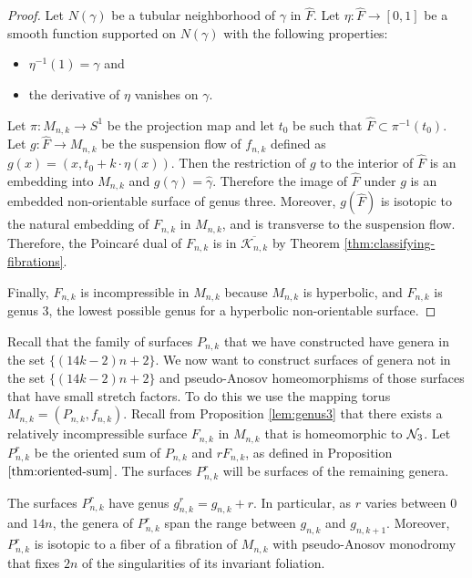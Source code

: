 \begin{proof}
  Let $N(\gamma)$ be a tubular neighborhood of $\gamma$ in $\hat{F}$.  Let $\eta: \hat{F} \xrightarrow{} [0,1]$ be a smooth function supported on $N(\gamma)$ with the following properties:
  \begin{itemize}
      \item $\eta^{-1}(1) = \gamma$ and
      \item the derivative of $\eta$ vanishes on $\gamma$. 
    \end{itemize}
Let $\pi:M_{n,k}\rightarrow S^1$ be the projection map and let $t_0$ be such that $\hat{F}\subset\pi^{-1}(t_0)$.  Let $g: \hat{F} \xrightarrow{} M_{n,k}$ be the suspension flow of $f_{n,k}$ defined as $g(x) =(x,t_0+k\cdot\eta(x))$. Then the restriction of $g$ to the interior of $\hat{F}$ is an embedding into $M_{n,k}$ and $g(\gamma) = \hat{\gamma}$. Therefore the image of $\hat{F}$ under $g$ is an embedded non-orientable surface of genus three. Moreover, $g(\hat{F})$ is isotopic to the natural embedding of $F_{n,k}$ in $M_{n,k}$, and is transverse to the suspension flow.  
  Therefore, the Poincar\'e dual of $F_{n,k}$ is in $\overline{\mathcal{K}_{n,k}}$ by Theorem \ref{thm:classifying-fibrations}.
   
  Finally, $F_{n,k}$ is incompressible in $M_{n,k}$ because $M_{n,k}$ is hyperbolic, and $F_{n,k}$ is genus $3$, the
  lowest possible genus for a hyperbolic non-orientable surface.
\end{proof}



Recall that the family of surfaces $P_{n,k}$ that we have constructed have genera in the set $\{(14k-2)n+2\}$.
We now want to construct surfaces of genera not in the set $\{(14k-2)n+2\}$ and pseudo-Anosov homeomorphisms of those surfaces that have small stretch factors.  To do this we use the mapping torus $M_{n,k}= (P_{n,k},f_{n,k})$. Recall from Proposition \ref{lem:genus3} that there exists a relatively incompressible surface $F_{n,k}$ in $M_{n,k}$ that is homeomorphic to $\mathcal{N}_3$.  Let $P_{n,k}^r$ be the oriented sum of $P_{n,k}$ and
$rF_{n,k}$, as defined in Proposition $\ref{thm:oriented-sum}$.  The surfaces $P_{n,k}^r$ will be surfaces of the remaining genera.

\begin{lem}
  The surfaces $P^r_{n,k}$ have genus $g^r_{n,k} = g_{n,k} + r$. In particular, as $r$ varies between
  $0$ and $14n$, the genera of $P^r_{n,k}$ span the range between $g_{n,k}$ and $g_{n,k+1}$. Moreover,
  $P^r_{n,k}$ is isotopic to a fiber of a fibration of $M_{n,k}$ with pseudo-Anosov monodromy that fixes $2n$
  of the singularities of its invariant foliation.
\end{lem}

